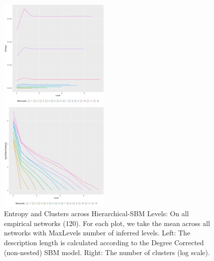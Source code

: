 \documentclass[aps,pre,superscriptaddress]{article}
\begin{document}
\begin{figure}
	\centering
	\begin{subfloat}
		\centering
		\includegraphics[width=0.48\textwidth]{fig1.pdf}
	\end{subfloat}
	\begin{subfloat}
		\centering
		\includegraphics[width=0.48\textwidth]{fig2.pdf}
	\end{subfloat}
	\caption{Entropy and Clusters across Hierarchical-SBM Levels:
		On all empirical networks (120).
		For each plot, we take the mean across all networks with MaxLevels number of inferred levels.
		Left: The description length is calculated according to the Degree Corrected (non-nested) SBM model.
		Right: The number of clusters (log scale).
	}
	\label{figs:fig1}
\end{figure}
\end{document}
